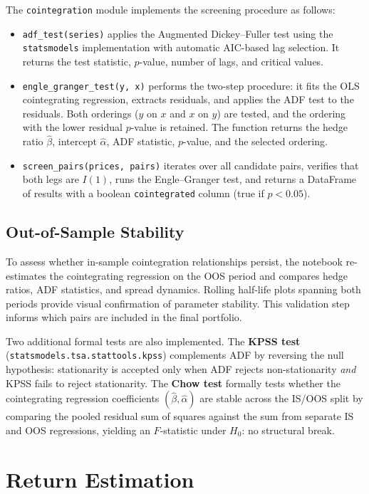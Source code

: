 \documentclass[a4paper]{report}
\begin{document}
The \texttt{cointegration} module implements the screening procedure as follows:
\begin{itemize}
    \item \texttt{adf\_test(series)} applies the Augmented Dickey--Fuller test using the \texttt{statsmodels} implementation with automatic AIC-based lag selection. It returns the test statistic, $p$-value, number of lags, and critical values.
    \item \texttt{engle\_granger\_test(y, x)} performs the two-step procedure: it fits the OLS cointegrating regression, extracts residuals, and applies the ADF test to the residuals. Both orderings ($y$ on $x$ and $x$ on $y$) are tested, and the ordering with the lower residual $p$-value is retained. The function returns the hedge ratio $\hat{\beta}$, intercept $\hat{\alpha}$, ADF statistic, $p$-value, and the selected ordering.
    \item \texttt{screen\_pairs(prices, pairs)} iterates over all candidate pairs, verifies that both legs are $I(1)$, runs the Engle--Granger test, and returns a DataFrame of results with a boolean \texttt{cointegrated} column (true if $p < 0.05$).
\end{itemize}

\subsection{Out-of-Sample Stability}

To assess whether in-sample cointegration relationships persist, the notebook re-estimates the cointegrating regression on the OOS period and compares hedge ratios, ADF statistics, and spread dynamics. Rolling half-life plots spanning both periods provide visual confirmation of parameter stability. This validation step informs which pairs are included in the final portfolio.

Two additional formal tests are also implemented. The \textbf{KPSS test} (\texttt{statsmodels.tsa.stattools.kpss}) complements ADF by reversing the null hypothesis: stationarity is accepted only when ADF rejects non-stationarity \emph{and} KPSS fails to reject stationarity. The \textbf{Chow test} formally tests whether the cointegrating regression coefficients $(\hat{\beta}, \hat{\alpha})$ are stable across the IS/OOS split by comparing the pooled residual sum of squares against the sum from separate IS and OOS regressions, yielding an $F$-statistic under $H_0$: no structural break.

\section{Return Estimation}
\end{document}
